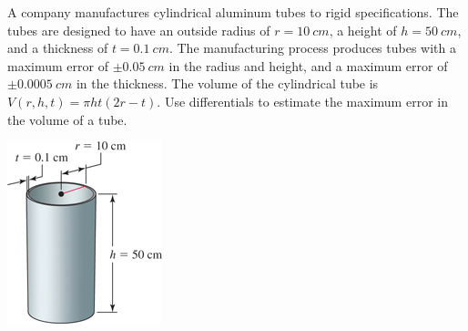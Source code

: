 \documentclass[../mathNotesPreamble]{subfiles}
\begin{document}
  \begin{minipage}{0.775\linewidth}
    \begin{ex*}
      A company manufactures cylindrical aluminum tubes to rigid specifications. The tubes are designed to have an outside radius of $r=10\ cm$, a height of $h=50\ cm$, and a thickness of $t=0.1\ cm$. The manufacturing process produces tubes with a maximum error of $\pm0.05\ cm$ in the radius and height, and a maximum error of $\pm 0.0005\ cm$ in the thickness. The volume of the cylindrical tube is $V(r,h,t)=\pi ht(2r-t)$. Use differentials to estimate the maximum error in the volume of a tube.
    \end{ex*}
  \end{minipage}%
  \begin{minipage}{0.225\linewidth}
    \begin{flushright}
      \includegraphics[width=0.9\linewidth]{../images/briggs_15_06/fig15_66}
    \end{flushright}
  \end{minipage}
  \pagebreak

  
\end{document}
